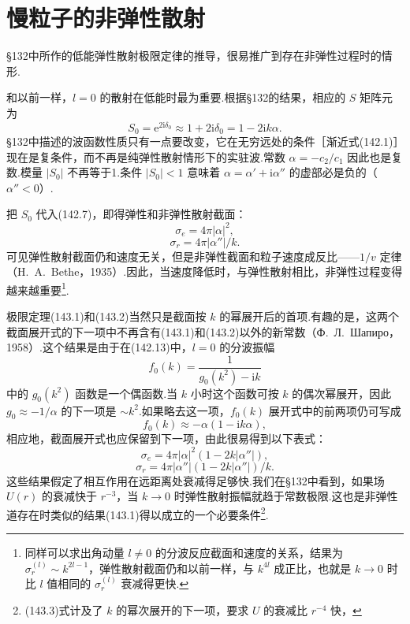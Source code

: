 \section{慢粒子的非弹性散射}

§132中所作的低能弹性散射极限定律的推导，很易推广到存在非弹性过程时的情形.

和以前一样，$l=0$ 的散射在低能时最为重要.根据§132的结果，相应的 $S$ 矩阵元为
\begin{equation*}
  S_0=\mathrm{e}^{2\mathrm{i}\delta_0}\approx1+2\mathrm{i}\delta_0=1-2\mathrm{i}k\alpha.
\end{equation*}
§132中描述的波函数性质只有一点要改变，它在无穷远处的条件［渐近式(142.1)］现在是复条件，而不再是纯弹性散射情形下的实驻波.常数 $\alpha=-c_2/c_1$ 因此也是复数.模量 $|S_0|$ 不再等于1.条件 $|S_0|<1$ 意味着 $\alpha=\alpha'+\mathrm{i}\alpha''$ 的虚部必是负的（$\alpha''<0$）.

把 $S_0$ 代入(142.7)，即得弹性和非弹性散射截面：
\begin{equation}
  \sigma_e=4\pi|\alpha|^2,
\end{equation}
\begin{equation}
  \sigma_r=4\pi|\alpha''|/k.
\end{equation}
可见弹性散射截面仍和速度无关，但是非弹性截面和粒子速度成反比——$1/v$ 定律（H.~A.~Bethe，1935）.因此，当速度降低时，与弹性散射相比，非弹性过程变得越来越重要\footnote{同样可以求出角动量 $l\neq0$ 的分波反应截面和速度的关系，结果为 $\sigma_r^{(l)}\sim k^{2l-1}$，弹性散射截面仍和以前一样，与 $k^{4l}$ 成正比，也就是 $k\to0$ 时比 $l$ 值相同的 $\sigma_r^{(l)}$ 衰减得更快.}.

极限定理(143.1)和(143.2)当然只是截面按 $k$ 的幂展开后的首项.有趣的是，这两个截面展开式的下一项中不再含有(143.1)和(143.2)以外的新常数（Ф.~Л.~Шапиро，1958）.这个结果是由于在(142.13)中，$l=0$ 的分波振幅
\begin{equation*}
  f_0(k)=\frac{1}{g_0(k^2)-\mathrm{i}k}
\end{equation*}
中的 $g_0(k^2)$ 函数是一个偶函数.当 $k$ 小时这个函数可按 $k$ 的偶次幂展开，因此 $g_0\approx-1/\alpha$ 的下一项是 $\sim k^2$.如果略去这一项，$f_0(k)$ 展开式中的前两项仍可写成
\begin{equation*}
  f_0(k)\approx-\alpha(1-\mathrm{i}k\alpha),
\end{equation*}
相应地，截面展开式也应保留到下一项，由此很易得到以下表式：
\begin{equation}
  \sigma_e=4\pi|\alpha|^2\left(1-2k|\alpha''|\right),
\end{equation}
\begin{equation}
  \sigma_r=4\pi|\alpha''|\left(1-2k|\alpha''|\right)/k.
\end{equation}
这些结果假定了相互作用在远距离处衰减得足够快.我们在§132中看到，如果场 $U(r)$ 的衰减快于 $r^{-3}$，当 $k\to0$ 时弹性散射振幅就趋于常数极限.这也是非弹性道存在时类似的结果(143.1)得以成立的一个必要条件\footnote{(143.3)式计及了 $k$ 的幂次展开的下一项，要求 $U$ 的衰减比 $r^{-4}$ 快，}.

